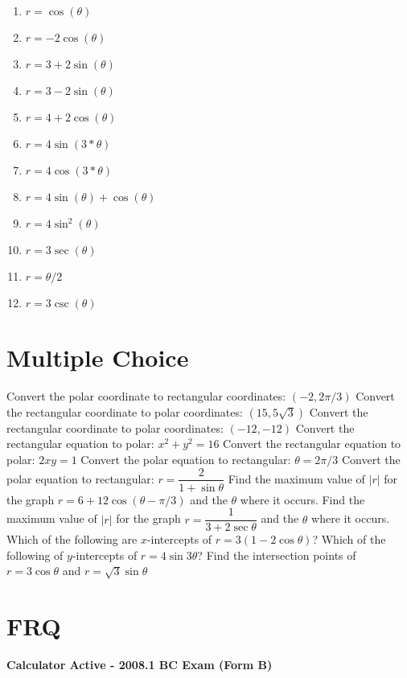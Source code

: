 \documentclass[12pt]{exam}
\begin{document}
\vspace{2ex}
\begin{multicols}{3}
	\begin{enumerate}
		\item $r = \cos(\theta)$
		\item $r = -2 \cos(\theta)$
		\item $r = 3+2\sin(\theta)$
		\item $r = 3-2\sin(\theta)$
		\item $r=4+2\cos(\theta)$
		\item $r=4\sin(3*\theta)$
		\item $r=4\cos(3*\theta)$
		\item $r=4\sin(\theta)+\cos(\theta)$
		\item $r=4\sin^2(\theta)$
		\item $r = 3\sec(\theta)$
		\item $r = \theta/2$
		\item $r = 3\csc(\theta)$
	\end{enumerate}
	\end{multicols}
\clearpage
\section{Multiple Choice}
\begin{questions}
\question Convert the polar coordinate to rectangular coordinates: $(-2, 2\pi/3)$
\question Convert the rectangular coordinate to polar coordinates: $(15, 5\sqrt{3})$
\question Convert the rectangular coordinate to polar coordinates: $(-12, -12)$
\question Convert the rectangular equation to polar: $x^2 + y^2 = 16$
\question Convert the rectangular equation to polar: $2xy=1$
\question Convert the polar equation to rectangular: $\theta = 2\pi/3$
\question Convert the polar equation to rectangular: $r = \dfrac{2}{1 + \sin \theta}$
\question Find the maximum value of $|r|$ for the graph $r = 6 + 12 \cos(\theta - \pi/3)$ and the $\theta$ where it occurs.
\question Find the maximum value of $|r|$ for the graph $r = \dfrac{1}{3 + 2\sec{\theta}}$ and the $\theta$ where it occurs.
\question Which of the following are $x$-intercepts of $r = 3(1-2\cos\theta)$?
\question Which of the following of $y$-intercepts of $r = 4 \sin 3\theta$?
\question Find the intersection points of $r = 3 \cos \theta$ and $r = \sqrt3 \sin \theta$
\end{questions}

\section{FRQ}
\noindent
\textbf{Calculator Active - 2008.1 BC Exam (Form B)}
\vspace{2ex}
\end{document}

